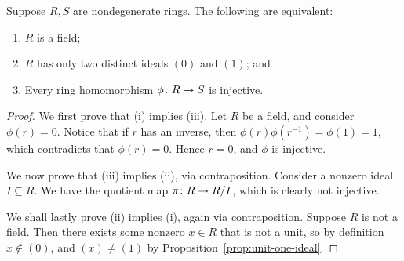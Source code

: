 \begin{theorem}\label{thm:field-props}
    Suppose \(R,S\) are nondegenerate rings.
    The following are equivalent:
    \begin{enumerate}[label={(\roman*)}, itemsep=0mm]
        \item \(R\) is a field;
        \item \(R\) has only two distinct ideals \((0)\) and \((1)\); and
        \item Every ring homomorphism \(\phi\colon R\to S\) is injective.
    \end{enumerate}
\end{theorem}
\begin{proof}
    We first prove that (i) implies (iii).
    Let \(R\) be a field, and consider \(\phi(r) = 0\).
    Notice that if \(r\) has an inverse,
    then \(\phi(r)\phi(r^{-1}) = \phi(1) = 1\),
    which contradicts that \(\phi(r) = 0\).
    Hence \(r = 0\), and \(\phi\) is injective.

    We now prove that (iii) implies (ii), via contraposition.
    Consider a nonzero ideal \(I \subseteq R\).
    We have the quotient map \(\pi\colon R\to R/I\),
    which is clearly not injective.
    
    We shall lastly prove (ii) implies (i), again via contraposition.
    Suppose \(R\) is not a field.
    Then there exists some nonzero \(x \in R\) that is not a unit,
    so by definition \(x \notin (0)\),
    and \((x) \neq (1)\) by Proposition~\ref{prop:unit-one-ideal}.
\end{proof}

